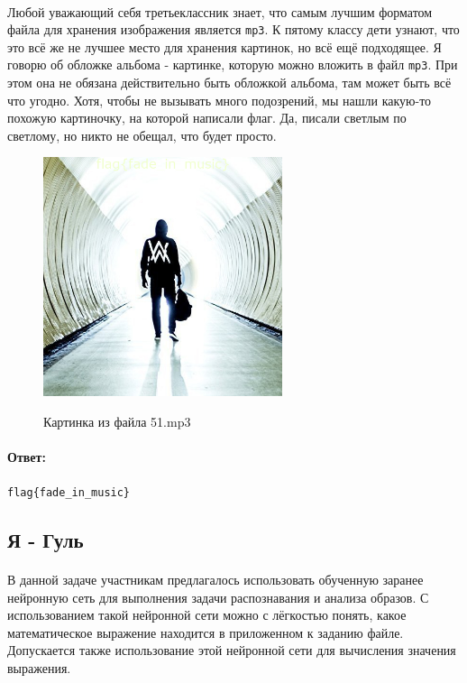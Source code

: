 \documentclass[12pt]{article}
\begin{document}
    \paragraph{}
    Любой уважающий себя третьеклассник знает, что самым лучшим форматом файла для хранения изображения является \verb|mp3|.
    К пятому классу дети узнают, что это всё же не лучшее место для хранения картинок, но всё ещё подходящее.
    Я говорю об обложке альбома - картинке, которую можно вложить в файл \verb|mp3|.
    При этом она не обязана действительно быть обложкой альбома, там может быть всё что угодно.
    Хотя, чтобы не вызывать много подозрений, мы нашли какую-то похожую картиночку, на которой написали флаг.
    Да, писали светлым по светлому, но никто не обещал, что будет просто.
    \begin{figure}[H]
        \centering
        \includegraphics[width=7cm]{task51}
        \label{fig:task51}
        \caption{Картинка из файла 51.mp3}
    \end{figure}
    \paragraph{Ответ:}
    \verb|flag{fade_in_music}|

    \subsection{Я - Гуль}
    \paragraph{}
    В данной задаче участникам предлагалось использовать обученную заранее нейронную сеть для выполнения задачи распознавания и анализа образов.
    С использованием такой нейронной сети можно с лёгкостью понять, какое математическое выражение находится в приложенном к заданию файле.
    Допускается также использование этой нейронной сети для вычисления значения выражения.
\end{document}
